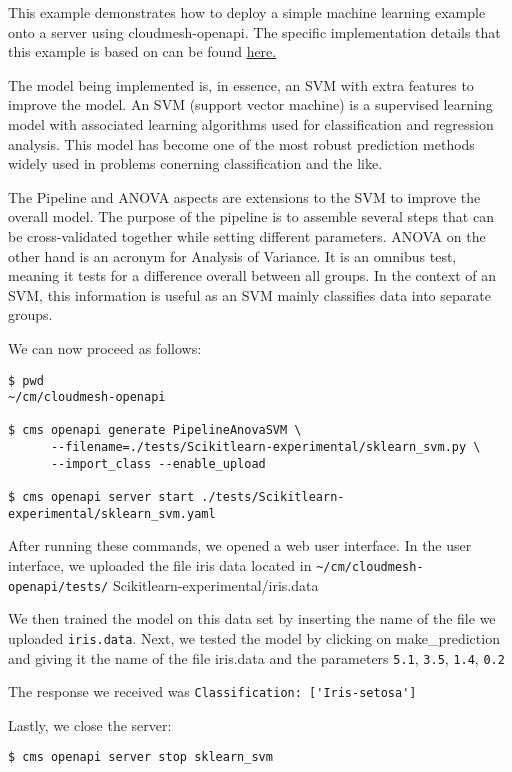 This example demonstrates how to deploy a simple machine learning
example onto a server using cloudmesh-openapi. The specific
implementation details that this example is based on can be found
\href{https://scikit-learn.org/stable/auto_examples/feature_selection/plot_feature_selection_pipeline.html}{here.}

The model being implemented is, in essence, an SVM with extra features
to improve the model. An SVM (support vector machine) is a supervised
learning model with associated learning algorithms used for
classification and regression analysis. This model has become one of the
most robust prediction methods widely used in problems conerning
classification and the like.

The Pipeline and ANOVA aspects are extensions to the SVM to improve the
overall model. The purpose of the pipeline is to assemble several steps
that can be cross-validated together while setting different parameters.
ANOVA on the other hand is an acronym for Analysis of Variance. It is an
omnibus test, meaning it tests for a difference overall between all
groups. In the context of an SVM, this information is useful as an SVM
mainly classifies data into separate groups.

We can now proceed as follows:

\begin{verbatim}
$ pwd
~/cm/cloudmesh-openapi

$ cms openapi generate PipelineAnovaSVM \
      --filename=./tests/Scikitlearn-experimental/sklearn_svm.py \
      --import_class --enable_upload

$ cms openapi server start ./tests/Scikitlearn-experimental/sklearn_svm.yaml
\end{verbatim}

After running these commands, we opened a web user interface. In the
user interface, we uploaded the file iris data located in
\verb|~/cm/cloudmesh-openapi/tests/|
Scikitlearn-experimental/iris.data

We then trained the model on this data set by inserting the name of the
file we uploaded \verb|iris.data|. Next, we tested the model by
clicking on make\_prediction and giving it the name of the file
iris.data and the parameters \verb|5.1|, \verb|3.5|, \verb|1.4|,
\verb|0.2|

The response we received was
\verb|Classification: ['Iris-setosa']|

Lastly, we close the server:

\begin{verbatim}
$ cms openapi server stop sklearn_svm
\end{verbatim}

